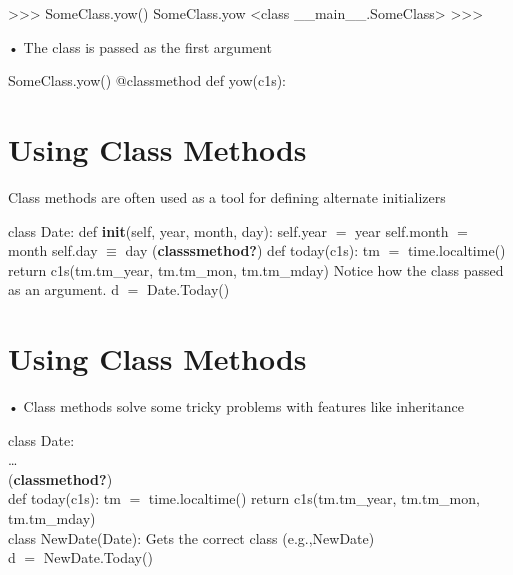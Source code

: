 \documentclass[
  letterpaper,
  DIV=11,
  numbers=noendperiod]{scrreprt}
\newenvironment{Shaded}{\begin{snugshade}}{\end{snugshade}}
\newcommand{\NormalTok}[1]{\textcolor[rgb]{0.00,0.23,0.31}{#1}}
\begin{document}
\begin{Shaded}
\begin{Highlighting}[]
\NormalTok{\textgreater{}\textgreater{}\textgreater{} SomeClass.yow()}
\NormalTok{SomeClass.yow \textless{}class \_\_main\_\_.SomeClass\textgreater{}}
\NormalTok{\textgreater{}\textgreater{}\textgreater{} }
\end{Highlighting}
\end{Shaded}

• The class is passed as the first argument

\begin{Shaded}
\begin{Highlighting}[]
\NormalTok{SomeClass.yow() @classmethod def yow(c1s): }
\end{Highlighting}
\end{Shaded}


\chapter{Using Class Methods}\label{using-class-methods}

Class methods are often used as a tool for defining alternate
initializers

class Date: def \textbf{init}(self, year, month, day): self.year \(=\)
year self.month \(=\) month self.day \(\equiv\) day
(\textbf{classsmethod?}) def today(c1s): tm \(=\) time.localtime()
return c1s(tm.tm\_year, tm.tm\_mon, tm.tm\_mday) Notice how the class
passed as an argument. d \(=\) Date.Today()


\chapter{Using Class Methods}\label{using-class-methods-1}

• Class methods solve some tricky problems with features like
inheritance

class Date:\\
\ldots{}\\
(\textbf{classmethod?})\\
def today(c1s): tm \(=\) time.localtime() return c1s(tm.tm\_year,
tm.tm\_mon, tm.tm\_mday)\\
class NewDate(Date): Gets the correct class (e.g.,NewDate)\\
d \(=\) NewDate.Today()

\end{document}
